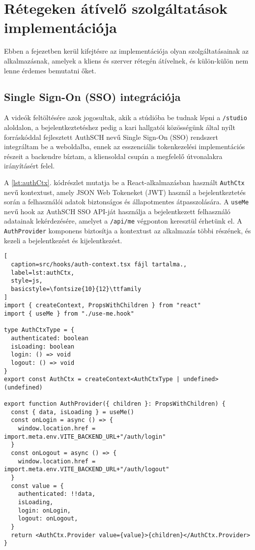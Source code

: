 \chapter{Rétegeken átívelő szolgáltatások implementációja}

Ebben a fejezetben kerül kifejtésre az implementációja olyan szolgáltatásainak az alkalmazásnak, amelyek a kliens és szerver rétegén átívelnek, és külön-külön nem lenne érdemes bemutatni őket.

\section{Single Sign-On (SSO) integrációja}

A videók feltöltésére azok jogosultak, akik a stúdióba be tudnak lépni a \verb|/studio| aloldalon, a bejelentkeztetéshez pedig a kari hallgatói közösségünk által nyílt forráskóddal fejlesztett AuthSCH nevű Single Sign-On (SSO) rendszert integráltam be a weboldalba,  ennek az esszenciális tokenkezelési implementációs részeit a backendre bíztam, a kliensoldal csupán a megfelelő útvonalakra irányításért felel.

A \ref{lst:authCtx}. kódrészlet mutatja be a React-alkalmazásban használt \verb|AuthCtx| nevű kontextust, amely JSON Web Tokeneket (JWT) használ a bejelentkeztetés során a felhasználói adatok biztonságos és állapotmentes átpasszolására. A \verb|useMe| nevű hook az AuthSCH SSO API-ját használja a bejelentkezett felhasználó adatainak lekérdezésére, amelyet a \verb|/api/me| végponton keresztül érhetünk el. A \verb|AuthProvider| komponens biztosítja a kontextust az alkalmazás többi részének, és kezeli a bejelentkezést és kijelentkezést.

\begin{minipage}{0.92\textwidth}
  \begin{lstlisting}[
  caption=src/hooks/auth-context.tsx fájl tartalma.,
  label=lst:authCtx,
  style=js,
  basicstyle=\fontsize{10}{12}\ttfamily
]
import { createContext, PropsWithChildren } from "react"
import { useMe } from "./use-me.hook"

type AuthCtxType = {
  authenticated: boolean
  isLoading: boolean
  login: () => void
  logout: () => void
}
export const AuthCtx = createContext<AuthCtxType | undefined>(undefined)

export function AuthProvider({ children }: PropsWithChildren) {
  const { data, isLoading } = useMe()
  const onLogin = async () => {
    window.location.href = import.meta.env.VITE_BACKEND_URL+"/auth/login"
  }
  const onLogout = async () => {
    window.location.href = import.meta.env.VITE_BACKEND_URL+"/auth/logout"
  }
  const value = {
    authenticated: !!data,
    isLoading,
    login: onLogin,
    logout: onLogout,
  }
  return <AuthCtx.Provider value={value}>{children}</AuthCtx.Provider>
}
\end{lstlisting}
\end{minipage}